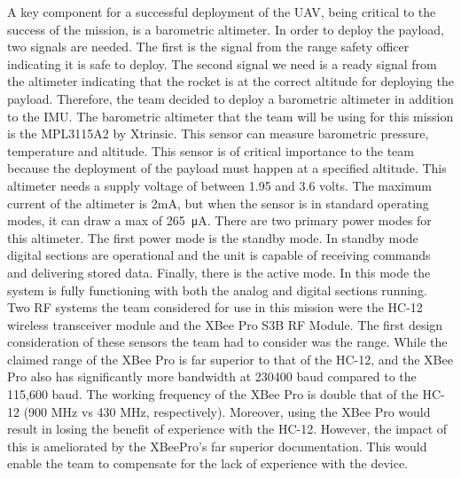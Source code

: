 A key component for a successful deployment of the UAV, being critical to the success of the mission, is a barometric altimeter. In order to deploy the payload, two signals are needed. The first is the signal from the range safety officer indicating it is safe to deploy. The second signal we need is a ready signal from the altimeter indicating that the rocket is at the correct altitude for deploying the payload. Therefore, the team decided to deploy a barometric altimeter in addition to the IMU. 
	The barometric altimeter that the team will be using for this mission is the MPL3115A2  by Xtrinsic. This sensor can measure barometric pressure, temperature and altitude. This sensor is of critical importance to the team because the deployment of the payload must happen at a specified altitude. This altimeter needs a supply voltage of between 1.95 and 3.6 volts. The maximum current of the altimeter is 2mA, but  when the sensor is in standard operating modes, it can draw a max of \SI{265}{\micro\ampere}. There are two primary power modes for this altimeter. The first power mode is the standby mode. In standby mode digital sections are operational and the unit is capable of receiving commands and delivering stored data. Finally, there is the active mode. In this mode the system is fully functioning with both the analog and digital sections running. 
Two RF systems the team considered for use in this mission were the HC-12 wireless transceiver module and the XBee Pro S3B RF Module. The first design consideration of these sensors the team had to consider was the range. While the claimed range of the XBee Pro is far superior to that of the HC-12, and the XBee Pro also has significantly more bandwidth at 230400 baud compared to the 115,600 baud. The working frequency of the XBee Pro is double that of the HC-12 (900 MHz vs 430 MHz, respectively). Moreover, using the XBee Pro  would result in losing the benefit of experience with the HC-12. However, the impact of this is ameliorated by the XBeePro’s far superior documentation. This would enable the team to  compensate for the lack of experience with the device.

